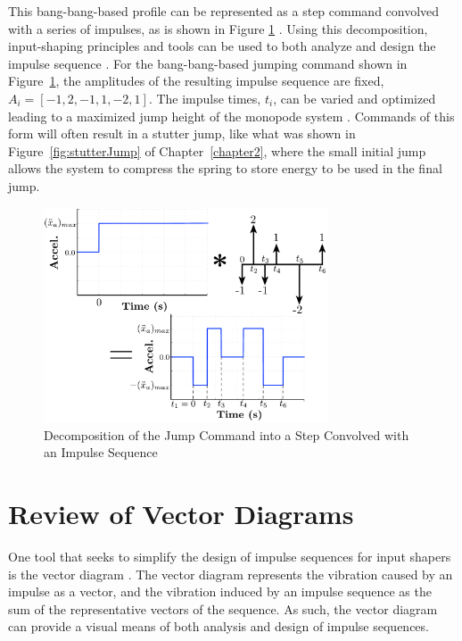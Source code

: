 This bang-bang-based profile can be represented as a step command convolved with a series of impulses, as is shown in Figure \ref{fig:jumpConvolve} \cite{Sorensen2008CommandinducedVA}. Using this decomposition, input-shaping principles and tools can be used to both analyze and design the impulse sequence \cite{Singer:90, Singhose:94a}. For the bang-bang-based jumping command shown in Figure~\ref{fig:jumpConvolve}, the amplitudes of the resulting impulse sequence are fixed, $A_i = [-1, 2, -1, 1, -2, 1]$. The impulse times, $t_i$, can be varied and optimized leading to a maximized jump height of the monopode system \cite{Vaughan2013}. Commands of this form will often result in a stutter jump, like what was shown in Figure~\ref{fig:stutterJump} of Chapter~\ref{chapter2}, where the small initial jump allows the system to compress the spring to store energy to be used in the final jump. 
%
\begin{figure}[tb!]
  \centering
    \includegraphics[width=0.75\textwidth]{Figures/Ch3/input_shaping/Jump_convolve.pdf}
    \caption{Decomposition of the Jump Command into a Step Convolved with an Impulse Sequence \cite{Vaughan2013}}
    \label{fig:jumpConvolve}
\end{figure}
%


\section{Review of Vector Diagrams}
\label{sec:vector_diagram_review}
%
One tool that seeks to simplify the design of impulse sequences for input shapers is the vector diagram \cite{Singhose:94a}. The vector diagram represents the vibration caused by an impulse as a vector, and the vibration induced by an impulse sequence as the sum of the representative vectors of the sequence. As such, the vector diagram can provide a visual means of both analysis and design of impulse sequences.

